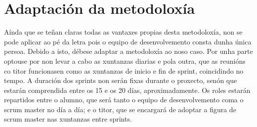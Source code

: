 \section{Adaptación da metodoloxía}
Aínda que se teñan claras todas as vantaxes propias desta metodoloxía, non se pode aplicar ao pé da letra pois o equipo de desenvolvemento consta dunha única persoa. Debido a isto, débese adaptar a metodoloxía ao noso caso. Por unha parte optouse por non levar a cabo as xuntanzas diarias e pola outra, que as reunións co titor funcionasen como as xuntanzas de inicio e fin de sprint, coincidindo no tempo. A duración dos sprints non serán fixas durante o proxecto, senón que estarán comprendida entre os 15 e os 20 días, aproximadamente.
Os roles estarán repartidos entre o alumno, que será tanto o equipo de desenvolvemento coma o scrum master no día a día; e o titor, que se encargará de adoptar a figura de scrum master nas xuntanzas entre sprints.
